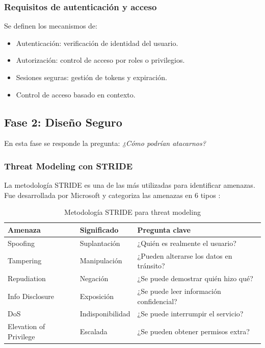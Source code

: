 \subsubsection{Requisitos de autenticación y acceso}

Se definen los mecanismos de:

\begin{itemize}
    \item Autenticación: verificación de identidad del usuario.
    \item Autorización: control de acceso por roles o privilegios.
    \item Sesiones seguras: gestión de tokens y expiración.
    \item Control de acceso basado en contexto.
\end{itemize}

\subsection{Fase 2: Diseño Seguro}

En esta fase se responde la pregunta: \textit{¿Cómo podrían atacarnos?}

\subsubsection{Threat Modeling con STRIDE}

La metodología STRIDE es una de las más utilizadas para identificar amenazas. Fue desarrollada por Microsoft y categoriza las amenazas en 6 tipos \cite{owasp2021}:

\begin{table}[h]
\centering
\small
\begin{tabular}{|l|l|p{5cm}|}
\hline
\textbf{Amenaza} & \textbf{Significado} & \textbf{Pregunta clave} \\
\hline
Spoofing & Suplantación & ¿Quién es realmente el usuario? \\
Tampering & Manipulación & ¿Pueden alterarse los datos en tránsito? \\
Repudiation & Negación & ¿Se puede demostrar quién hizo qué? \\
Info Disclosure & Exposición & ¿Se puede leer información confidencial? \\
DoS & Indisponibilidad & ¿Se puede interrumpir el servicio? \\
Elevation of Privilege & Escalada & ¿Se pueden obtener permisos extra? \\
\hline
\end{tabular}
\caption{Metodología STRIDE para threat modeling}
\label{tab:stride}
\end{table}

